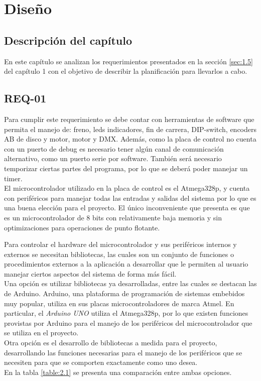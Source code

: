 \chapter{Diseño}
\thispagestyle{empty}

\section{Descripción del capítulo} \label{sec:\thesection}
En este capítulo se analizan los requerimientos presentados en la sección \ref{sec:1.5} del capítulo 1 con el objetivo de describir la planificación para llevarlos a cabo.

\section{REQ-01} \label{sec:\thesection}
Para cumplir este requerimiento se debe contar con herramientas de software que permita el manejo de: freno, leds indicadores, fin de carrera, DIP-switch, encoders AB de disco y motor, motor y DMX. Además, como la placa de control no cuenta con un puerto de debug es necesario tener algún canal de comunicación alternativo, como un puerto serie por software. También será necesario temporizar ciertas partes del programa, por lo que se deberá poder manejar un timer.\\
El microcontrolador utilizado en la placa de control es el Atmega328p, y cuenta con periféricos para manejar todas las entradas y salidas del sistema por lo que es una buena elección para el proyecto. El único inconveniente que presenta es que es un microcontrolador de 8 bits con relativamente baja memoria y sin optimizaciones para operaciones de punto flotante. 

Para controlar el hardware del microcontrolador y sus periféricos internos y externos se necesitan bibliotecas, las cuales son un conjunto de funciones o procedimientos externos a la aplicación a desarrollar que le permiten al usuario manejar ciertos aspectos del sistema de forma más fácil.\\
Una opción es utilizar bibliotecas ya desarrolladas, entre las cuales se destacan las de Arduino. Arduino, una plataforma de programación de sistemas embebidos muy popular, utiliza en sus placas microcontroladores de marca Atmel. En particular, el \textit{Arduino UNO} utiliza el Atmega328p, por lo que existen funciones provistas por Arduino para el manejo de los periféricos del microcontrolador que se utiliza en el proyecto. \\
Otra opción es el desarrollo de bibliotecas a medida para el proyecto, desarrollando las funciones necesarias para el manejo de los periféricos que se necesiten para que se comporten exactamente como uno desea.\\
En la tabla \ref{table:2.1} se presenta una comparación entre ambas opciones.


